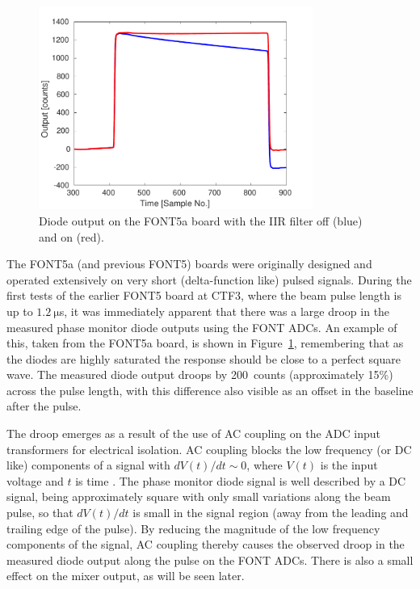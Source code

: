 \begin{figure}
  \centering
  \includegraphics[width=0.8\textwidth]{Figures/commissioning/iirDiodeFiltOffOn}
  \caption{Diode output on the FONT5a board with the IIR filter off (blue) and on (red).}
  \label{f:iirDiodefiltOffOn}
\end{figure}

The FONT5a (and previous FONT5) boards were originally designed and operated extensively on very short (delta-function like) pulsed signals.
During the first tests of the earlier FONT5 board at CTF3, where the beam pulse length is up to \(1.2~\mathrm{\mu}\)s, it was immediately apparent that there was a large droop in the measured phase monitor diode outputs using the FONT ADCs. An example of this, taken from the FONT5a board, is shown in Figure~\ref{f:iirDiodefiltOffOn}, remembering that as the diodes are highly saturated the response should be close to a perfect square wave. The measured diode output droops by 200~counts (approximately 15\%) across the pulse length, with this difference also visible as an offset in the baseline after the pulse.

The droop emerges as a result of the use of AC coupling on the ADC input transformers for electrical isolation. 
AC coupling blocks the low frequency (or DC like) components of a signal with  \({dV(t)}/{dt}\sim0\), where \(V(t)\) is the input voltage and \(t\) is time \cite{acCoupling}. 
The phase monitor diode signal is  well described by a DC signal, being approximately square with only small variations along the beam pulse, so that \({dV(t)}/{dt}\) is small in the signal region (away from the leading and trailing edge of the pulse). By reducing the magnitude of the low frequency components of the signal, AC coupling thereby causes the observed droop in the measured diode output along the pulse on the FONT ADCs.
There is also a small effect on the mixer output, as will be seen later.

